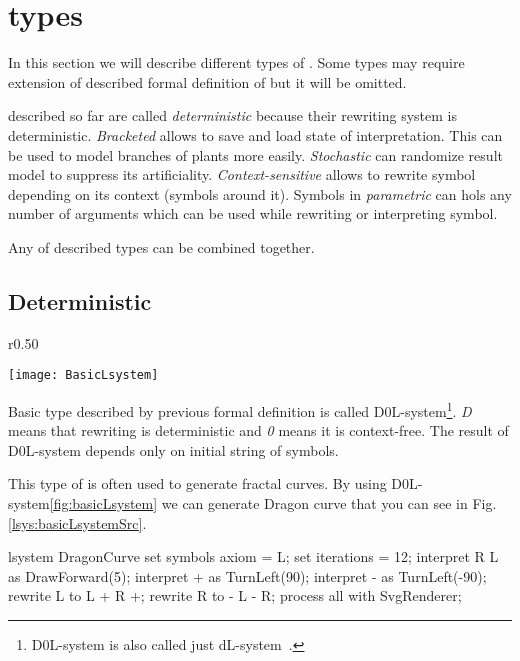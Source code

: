 \newpage
\section{\lsystem types}

In this section we will describe different types of \lsystems.
Some types may require extension of described formal definition of \lsystem but it will be omitted.

\lsystems described so far are called \emph{deterministic \lsystems} because their rewriting system is deterministic.
\emph{Bracketed \lsystems} allows to save and load state of interpretation.
This can be used to model branches of plants more easily.
\emph{Stochastic \lsystems} can randomize result model to suppress its artificiality.
\emph{Context-sensitive \lsystems} allows to rewrite symbol depending on its context (symbols around it).
Symbols in \emph{parametric \lsystems} can hols any number of arguments which can be used while rewriting or interpreting symbol.

Any of described types can be combined together.



\subsection{Deterministic \lsystems}

\newcommand{\dzerolsystem}{\mbox{D0L-system}\xspace}
\newcommand{\dlsystem}{\mbox{dL-system}\xspace}


\begin{wrapfigure}{r}{0.50\textwidth}
	\vspace{-40pt}
	\begin{center}
	\texttt{[image: BasicLsystem]}
	\end{center}
	\caption{Dragon curve}
	\label{fig:basicLsystem}
\end{wrapfigure}


Basic \lsystem type described by previous formal definition is called \dzerolsystem\footnote{\dzerolsystem is also called just \dlsystem~\cite{Zar04}.}.
\emph{D} means that rewriting is deterministic and \emph{0} means it is context-free.
The result of \dzerolsystem depends only on initial string of symbols.

This type of \lsystem is often used to generate fractal curves.
By using \dzerolsystem \ref{fig:basicLsystem} we can generate Dragon curve that you can see in Fig. \ref{lsys:basicLsystemSrc}.

\begin{Lsystem}[label=lsys:basicLsystemSrc,caption={Basic \dzerolsystem for generation of Dragon curve (Fig. \ref{fig:basicLsystem})}]
lsystem DragonCurve {
	set symbols axiom = L;
	set iterations = 12;
	interpret R L as DrawForward(5);
	interpret + as TurnLeft(90);
	interpret - as TurnLeft(-90);
	rewrite L to L + R +;
	rewrite R to - L - R;
}
process all with SvgRenderer;
\end{Lsystem}


